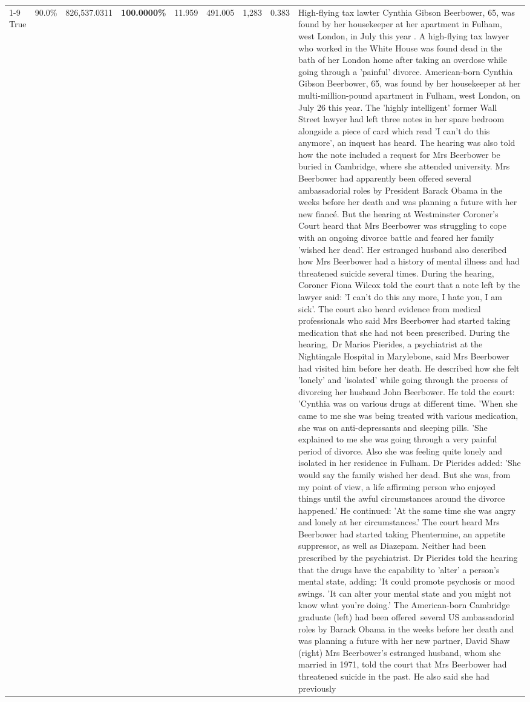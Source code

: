 \begin{table}[H]
\begin{tabular}{lllrlllll}
\cline{1-9}
True & 90.0\% & 826,537.0311 & \bfseries \color{red} 100.0000\% & 11.959 & 491.005 & 1,283 & 0.383 & High-flying tax lawter Cynthia Gibson Beerbower, 65, was found by her housekeeper at her apartment in Fulham, west London, in July this year . A high-flying tax lawyer who worked in the White House was found dead in the bath of her London home after taking an overdose while going through a 'painful' divorce. American-born Cynthia Gibson Beerbower, 65, was found by her housekeeper at her multi-million-pound apartment in Fulham, west London, on July 26 this year. The 'highly intelligent' former Wall Street lawyer had left three notes in her spare bedroom alongside a piece of card which read 'I can't do this anymore', an inquest has heard. The hearing was also told how the note included a request for Mrs Beerbower be buried in Cambridge, where she attended university. Mrs Beerbower had apparently been offered several ambassadorial roles by President Barack Obama in the weeks before her death and was planning a future with her new fiancé. But the hearing at Westminster Coroner's Court heard that Mrs Beerbower was struggling to cope with an ongoing divorce battle and feared her family 'wished her dead'. Her estranged husband also described how Mrs Beerbower had a history of mental illness and had threatened suicide several times. During the hearing, Coroner Fiona Wilcox told the court that a note left by the lawyer said: 'I can't do this any more, I hate you, I am sick'. The court also heard evidence from medical professionals who said Mrs Beerbower had started taking medication that she had not been prescribed. During the hearing, Dr Marios Pierides, a psychiatrist at the Nightingale Hospital in Marylebone, said Mrs Beerbower had visited him before her death. He described how she felt 'lonely' and 'isolated' while going through the process of divorcing her husband John Beerbower. He told the court: 'Cynthia was on various drugs at different time. 'When she came to me she was being treated with various medication, she was on anti-depressants and sleeping pills. 'She explained to me she was going through a very painful period of divorce. Also she was feeling quite lonely and isolated in her residence in Fulham. Dr Pierides added: 'She would say the family wished her dead. But she was, from my point of view, a life affirming person who enjoyed things until the awful circumstances around the divorce happened.' He continued: 'At the same time she was angry and lonely at her circumstances.' The court heard Mrs Beerbower had started taking Phentermine, an appetite suppressor, as well as Diazepam. Neither had been prescribed by the psychiatrist. Dr Pierides told the hearing that the drugs have the capability to 'alter' a person's mental state, adding: 'It could promote psychosis or mood swings. 'It can alter your mental state and you might not know what you're doing.' The American-born Cambridge graduate (left) had been offered several US ambassadorial roles by Barack Obama in the weeks before her death and was planning a future with her new partner, David Shaw (right) Mrs Beerbower's estranged husband, whom she married in 1971, told the court that Mrs Beerbower had threatened suicide in the past. He also said she had previously 
\end{tabular}
\end{table}
